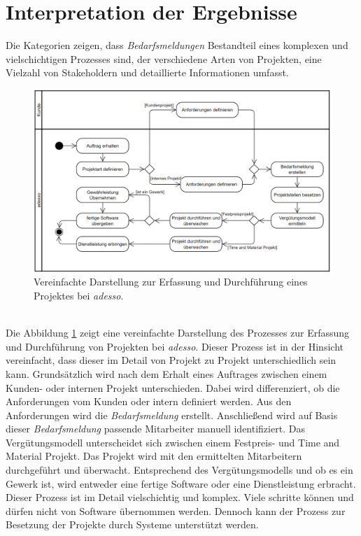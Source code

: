 \section{Interpretation der Ergebnisse}
Die Kategorien zeigen, dass \emph{Bedarfsmeldungen} Bestandteil eines komplexen und vielschichtigen Prozesses sind, der verschiedene Arten von Projekten, eine Vielzahl von Stakeholdern und detaillierte Informationen umfasst. 
\begin{figure}[H]%
	\centering  
	\includegraphics[scale=0.8]{Abbildungen/bedarfsmeldungsprozess.png}
	\caption{Vereinfachte Darstellung zur Erfassung und Durchführung eines Projektes bei \emph{adesso}.}
	\label{fig:bedarfsmeldungsprozess}
\end{figure}\mbox{} \\
Die Abbildung \ref{fig:bedarfsmeldungsprozess} zeigt eine vereinfachte Darstellung des Prozesses zur Erfassung und Durchführung von Projekten bei \emph{adesso}. Dieser Prozess ist in der Hinsicht vereinfacht, dass dieser im Detail von Projekt zu Projekt unterschiedlich sein kann. Grundsätzlich wird nach dem Erhalt eines Auftrages zwischen einem Kunden- oder internen Projekt unterschieden. Dabei wird differenziert, ob die Anforderungen vom Kunden oder intern definiert werden. Aus den Anforderungen wird die \emph{Bedarfsmeldung} erstellt. Anschließend wird auf Basis dieser \emph{Bedarfsmeldung} passende Mitarbeiter manuell identifiziert. Das Vergütungsmodell unterscheidet sich zwischen einem Festpreis- und Time and Material Projekt. Das Projekt wird mit den ermittelten Mitarbeitern durchgeführt und überwacht. Entsprechend des Vergütungsmodells und ob es ein Gewerk ist, wird entweder eine fertige Software oder eine Dienstleistung erbracht. Dieser Prozess ist im Detail vielschichtig und komplex. Viele schritte können und dürfen nicht von Software übernommen werden. Dennoch kann der Prozess zur Besetzung der Projekte durch Systeme unterstützt werden.\\

